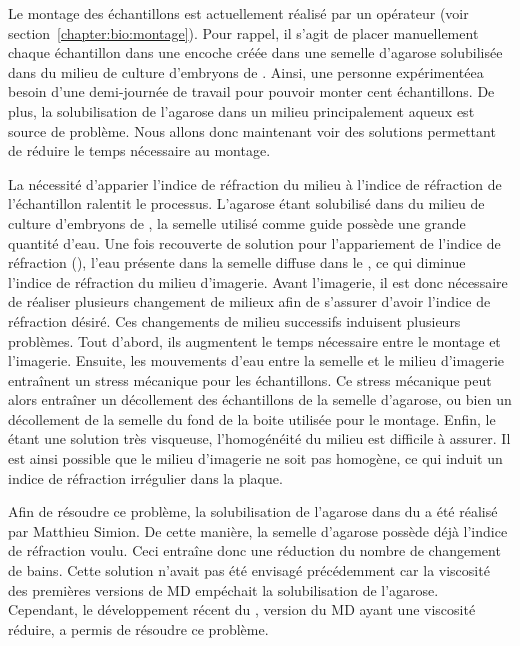 \documentclass[\main/main.tex]{subfiles}
\begin{document}
%    
Le montage des échantillons est actuellement réalisé par un opérateur (voir section~\ref{chapter:bio:montage}).
%
Pour rappel, il s'agit de placer manuellement chaque échantillon dans une encoche créée dans une semelle d'agarose solubilisée dans du milieu de culture d'embryons de \pzs{}.
%
Ainsi, une personne expérimentéea besoin d'une demi-journée de travail pour pouvoir monter cent échantillons.
%
De plus, la solubilisation de l'agarose dans un milieu principalement aqueux est source de problème.
%
Nous allons donc maintenant voir des solutions permettant de réduire le temps nécessaire au montage.

La nécessité d'apparier l'indice de réfraction du milieu à l'indice de réfraction de l'échantillon ralentit le processus.
%
L'agarose étant solubilisé dans du milieu de culture d'embryons de \pz{},
la semelle utilisé comme guide possède une grande quantité d'eau.
%
Une fois recouverte de solution pour l'appariement de l'indice de réfraction (\MD{}),
l'eau présente dans la semelle diffuse dans le \MD{}, ce qui diminue l'indice de réfraction du milieu d'imagerie.
%
Avant l'imagerie,
il est donc nécessaire de réaliser plusieurs changement de milieux afin de s'assurer d'avoir l'indice de réfraction désiré.
%
Ces changements de milieu successifs induisent plusieurs problèmes. Tout d'abord, ils augmentent le temps nécessaire entre le montage et l'imagerie.
%
Ensuite, les mouvements d'eau entre la semelle et le milieu d'imagerie entraînent un stress mécanique pour les échantillons.
%
Ce stress mécanique peut alors entraîner un décollement des échantillons de la semelle d'agarose,
ou bien un décollement de la semelle du fond de la boite utilisée pour le montage.
%
Enfin, le \MD{} étant une solution très visqueuse,  l'homogénéité du milieu est difficile à assurer.
%
Il est ainsi possible que le milieu d'imagerie ne soit pas homogène, ce qui induit un indice de réfraction irrégulier dans la plaque.

%
Afin de résoudre ce problème, la solubilisation de l'agarose dans du \MD{} a été réalisé par Matthieu Simion.
%
De cette manière, la semelle d'agarose possède déjà l'indice de réfraction voulu.
%
Ceci entraîne donc une réduction du nombre de changement de bains.
Cette solution n'avait pas été envisagé précédemment car la viscosité des premières versions de MD empéchait la solubilisation de l'agarose.
%
Cependant, le développement récent du \MD{}, version du MD ayant une viscosité réduire, a permis de résoudre ce problème.
\end{document}

